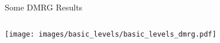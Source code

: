 
\begin{frame}{Some DMRG\: Results} %
    \begin{columns}
    \begin{column}{0.5\textwidth}
      \texttt{[image: images/basic\_levels/basic\_levels\_dmrg.pdf]}
    \end{column}
    \begin{column}{0.5\textwidth}
    \end{column}
  \end{columns}
\end{frame}




